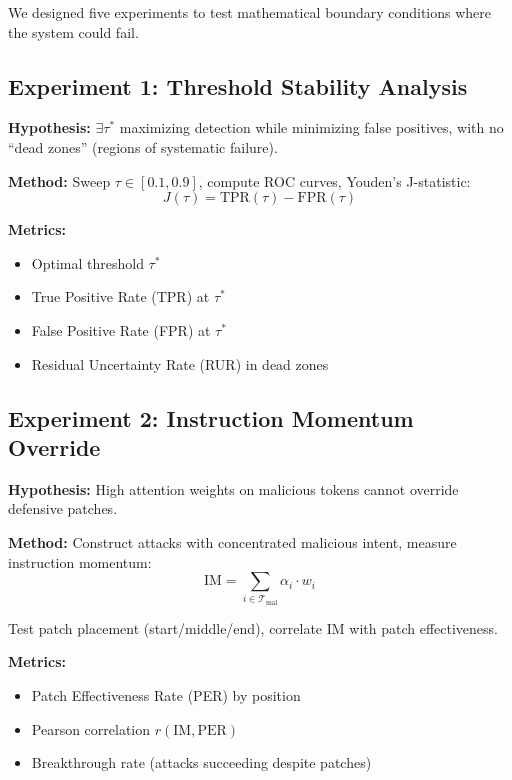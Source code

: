 \documentclass[11pt,twocolumn]{article}
\begin{document}
We designed five experiments to test mathematical boundary conditions where the system could fail.

\subsection{Experiment 1: Threshold Stability Analysis}

\textbf{Hypothesis:} $\exists \tau^*$ maximizing detection while minimizing false positives, with no ``dead zones'' (regions of systematic failure).

\textbf{Method:} Sweep $\tau \in [0.1, 0.9]$, compute ROC curves, Youden's J-statistic:
\begin{equation}
J(\tau) = \text{TPR}(\tau) - \text{FPR}(\tau)
\end{equation}

\textbf{Metrics:}
\begin{itemize}[noitemsep]
    \item Optimal threshold $\tau^*$
    \item True Positive Rate (TPR) at $\tau^*$
    \item False Positive Rate (FPR) at $\tau^*$
    \item Residual Uncertainty Rate (RUR) in dead zones
\end{itemize}

\subsection{Experiment 2: Instruction Momentum Override}

\textbf{Hypothesis:} High attention weights on malicious tokens cannot override defensive patches.

\textbf{Method:} Construct attacks with concentrated malicious intent, measure instruction momentum:
\begin{equation}
\text{IM} = \sum_{i \in \mathcal{T}_{\text{mal}}} \alpha_i \cdot w_i
\end{equation}

Test patch placement (start/middle/end), correlate IM with patch effectiveness.

\textbf{Metrics:}
\begin{itemize}[noitemsep]
    \item Patch Effectiveness Rate (PER) by position
    \item Pearson correlation $r(\text{IM}, \text{PER})$
    \item Breakthrough rate (attacks succeeding despite patches)
\end{itemize}
\end{document}
